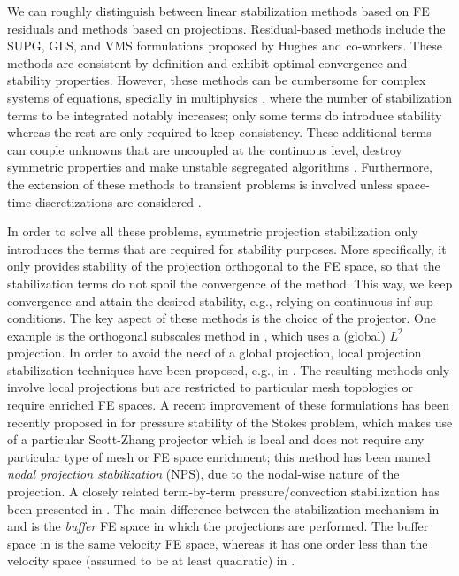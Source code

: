 We can roughly distinguish between linear stabilization methods based on FE residuals 
and methods based on projections. Residual-based methods include the
SUPG, GLS, and VMS formulations \cite{hughes_multiscale_1995,hughes_variational_1998} proposed by Hughes and co-workers. These
methods are consistent by definition and exhibit optimal convergence and stability properties.
However, these methods can be cumbersome for complex systems of equations, specially
in multiphysics \cite{planas_approximation_2011,badia_unconditionally_2013}, where the number of stabilization terms to be integrated 
notably increases; only some terms do introduce stability whereas the rest are only required
to keep consistency. These additional terms can couple unknowns that are uncoupled
at the con\-ti\-nuous level, destroy symmetric properties and  make unstable segregated
algorithms \cite{badia_unconditionally_2013}. Furthermore, the extension of these methods to transient problems is
involved unless space-time discretizations are considered \cite{codina_time_2007,burman_consistent_2010}. 


In order to solve all these problems, symmetric projection stabilization only introduces the terms that are required for stability purposes. More specifically, it only provides stability of the projection orthogonal to the FE space, so that the stabilization terms do not spoil the convergence of the method. %
This way, we keep convergence and attain the desired stability, e.g., relying on continuous inf-sup conditions. The key aspect of these methods is the choice of the projector. One example  is the orthogonal subscales method in \cite{codina_stabilization_2000}, which uses a (global) $L^2$ projection. In order to avoid the need of a global projection, local projection stabilization techniques have been proposed, e.g., in \cite{braack_local_2006,matthies_unified_2007}. The resulting methods only involve local projections but are restricted to particular mesh topologies or require enriched FE spaces. A recent improvement of these formulations has been recently proposed in \cite{badia_stabilized_2012} for pressure stability of the Stokes problem, which makes use of  a particular Scott-Zhang projector which is local and does not require any particular type of mesh or FE space enrichment; this method has been named \emph{nodal projection stabilization} (NPS), due to the nodal-wise nature of the projection. A closely related term-by-term pressure/convection stabilization has been presented in \cite{rebollo_high_2013}. The main difference between the stabilization mechanism in \cite{badia_stabilized_2012} and  \cite{rebollo_high_2013} is the \emph{buffer} FE space in which the projections are performed. The buffer space in \cite{badia_stabilized_2012} is the same velocity FE space, whereas  it has one order less than the velocity space (assumed to be at least quadratic) in \cite{rebollo_high_2013}.

